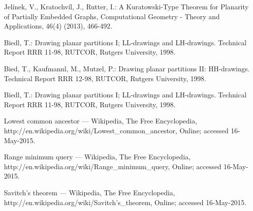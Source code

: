 \begin{thebibliography}{9}
	Jelínek, V., Kratochvíl, J., Rutter, I.: A Kuratowski-Type Theorem for Planarity of Partially Embedded Graphs, Computational Geometry - Theory and Applications, 46(4) (2013), 466-492.

	Biedl, T.: Drawing planar partitions I; LL-drawings and LH-drawings. Technical Report RRR 11-98, RUTCOR, Rutgers University, 1998.

	 Bied, T., Kaufmannl, M., Mutzel, P.: Drawing planar partitions II: 
HH-drawings. Technical Report RRR 12-98, RUTCOR, Rutgers University, 1998.

	Biedl, T.: Drawing planar partitions I; LL-drawings and LH-drawings. Technical Report RRR 11-98, RUTCOR, Rutgers University, 1998.

	Lowest common ancestor --- Wikipedia, The Free Encyclopedia, http://en.wikipedia.org/wiki/Lowest\_common\_ancestor, Online; accessed 16-May-2015.


	Range minimum query --- Wikipedia, The Free Encyclopedia, http://en.wikipedia.org/wiki/Range\_minimum\_query, Online; accessed 16-May-2015.


	Savitch's theorem --- Wikipedia, The Free Encyclopedia, http://en.wikipedia.org/wiki/Savitch's\_theorem, Online; accessed 16-May-2015.


\end{thebibliography}
